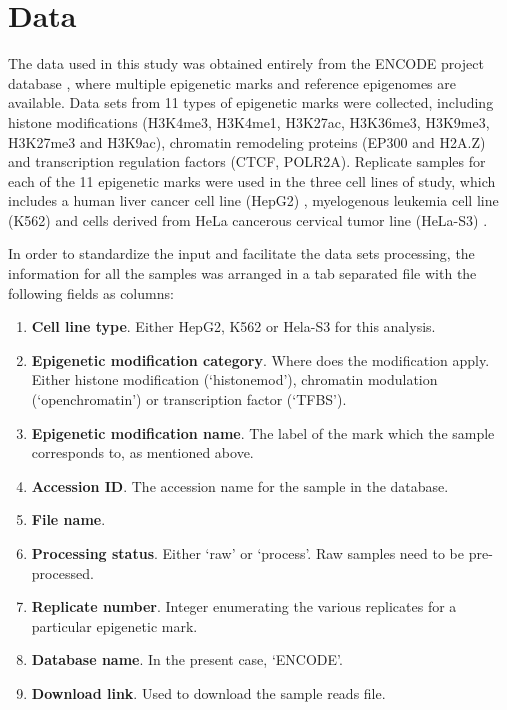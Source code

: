 
\section{Data}\label{data}

The data used in this study was obtained entirely from the ENCODE project database \cite{Feingold2004}, where multiple epigenetic marks and reference epigenomes are available. Data sets from 11 types of epigenetic marks were collected, including histone modifications (H3K4me3, H3K4me1, H3K27ac, H3K36me3, H3K9me3, H3K27me3 and H3K9ac), chromatin remodeling proteins (EP300 and H2A.Z) and transcription regulation factors (CTCF, POLR2A). Replicate samples for each of the 11 epigenetic marks were used in the three cell lines of study, which includes a human liver cancer cell line (HepG2) \cite{Aden1979}, myelogenous leukemia cell line (K562) \cite{Andersson1979} and cells derived from HeLa cancerous cervical tumor line (HeLa-S3) \cite{Douglas1973,Chen2008}.

\medskip

In order to standardize the input and facilitate the data sets processing, the information for all the samples was arranged in a tab separated file with the following fields as columns:

\begin{enumerate}
    \item \textbf{Cell line type}. Either HepG2, K562 or Hela-S3 for this analysis.
    \item \textbf{Epigenetic modification category}. Where does the modification apply. Either histone modification (`histonemod'), chromatin modulation (`openchromatin') or transcription factor (`TFBS').
    \item \textbf{Epigenetic modification name}. The label of the mark which the sample corresponds to, as mentioned above.
    \item \textbf{Accession ID}. The accession name for the sample in the database.
    \item \textbf{File name}.
    \item \textbf{Processing status}. Either `raw' or `process'. Raw samples need to be pre-processed.
    \item \textbf{Replicate number}. Integer enumerating the various replicates for a particular epigenetic mark.
    \item \textbf{Database name}. In the present case, `ENCODE'.
    \item \textbf{Download link}. Used to download the sample reads file.
\end{enumerate}

